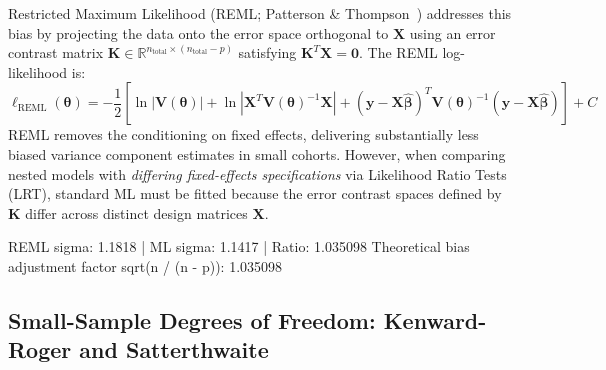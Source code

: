 \documentclass[11pt,twoside,openright]{book}
\begin{document}
Restricted Maximum Likelihood (REML; Patterson \& Thompson~\cite{patterson1971recovery}) addresses this bias by projecting the data onto the error space orthogonal to $\mathbf{X}$ using an error contrast matrix $\mathbf{K} \in \mathbb{R}^{n_{\text{total}} \times (n_{\text{total}}-p)}$ satisfying $\mathbf{K}^T \mathbf{X} = \mathbf{0}$. The REML log-likelihood is:
\begin{equation}
\label{eq:reml_likelihood}
\ell_{\text{REML}}(\boldsymbol{\theta}) = -\frac{1}{2} \left[ \ln |\mathbf{V}(\boldsymbol{\theta})| + \ln |\mathbf{X}^T \mathbf{V}(\boldsymbol{\theta})^{-1} \mathbf{X}| + (\mathbf{y} - \mathbf{X}\hat{\boldsymbol{\beta}})^T \mathbf{V}(\boldsymbol{\theta})^{-1} (\mathbf{y} - \mathbf{X}\hat{\boldsymbol{\beta}}) \right] + C
\end{equation}
REML removes the conditioning on fixed effects, delivering substantially less biased variance component estimates in small cohorts. However, when comparing nested models with \textit{differing fixed-effects specifications} via Likelihood Ratio Tests (LRT), standard ML must be fitted because the error contrast spaces defined by $\mathbf{K}$ differ across distinct design matrices $\mathbf{X}$.


\begin{routput}
REML sigma: 1.1818 | ML sigma: 1.1417 | Ratio: 1.035098
Theoretical bias adjustment factor sqrt(n / (n - p)): 1.035098
\end{routput}

\subsection{Small-Sample Degrees of Freedom: Kenward-Roger and Satterthwaite}
\end{document}
